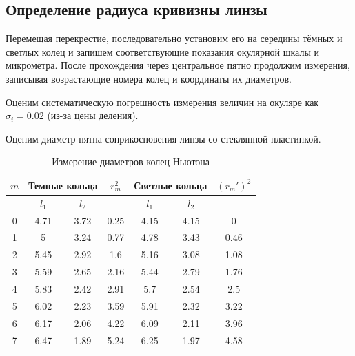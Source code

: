 \subsection*{Определение радиуса кривизны линзы}
Перемещая перекрестие, последовательно установим его на середины тёмных и светлых колец и запишем соответствующие показания окулярной шкалы и микрометра. После прохождения через центральное пятно продолжим измерения, записывая возрастающие номера колец и координаты их диаметров.

Оценим систематическую погрешность измерения величин на окуляре как $ \sigma_i = 0.02 $ (из-за цены деления).

Оценим диаметр пятна соприкосновения линзы со стеклянной пластинкой.

\begin{table}[h!]
\centering
\begin{tabular}{|c|cc|c|cc|c|}
\hline
$m$ & \multicolumn{2}{c|}{Темные кольца} & $r_m^2$ & \multicolumn{2}{c|}{Светлые кольца} & $(r_m')^2$ \\
\hline
 & $l_1$ & $l_2$ &  & $l_1$ & $l_2$ &  \\
\hline
0 & 4.71 & 3.72 & 0.25 & 4.15 & 4.15 & 0 \\
1 & 5 & 3.24 & 0.77 & 4.78 & 3.43 & 0.46 \\
2 & 5.45 & 2.92 & 1.6 & 5.16 & 3.08 & 1.08 \\
3 & 5.59 & 2.65 & 2.16 & 5.44 & 2.79 & 1.76 \\
4 & 5.83 & 2.42 & 2.91 & 5.7 & 2.54 & 2.5 \\
5 & 6.02 & 2.23 & 3.59 & 5.91 & 2.32 & 3.22 \\
6 & 6.17 & 2.06 & 4.22 & 6.09 & 2.11 & 3.96 \\
7 & 6.47 & 1.89 & 5.24 & 6.25 & 1.97 & 4.58 \\
\hline
\end{tabular}
\caption{Измерение диаметров колец Ньютона}
\label{tab:newton_rings}
\end{table}

